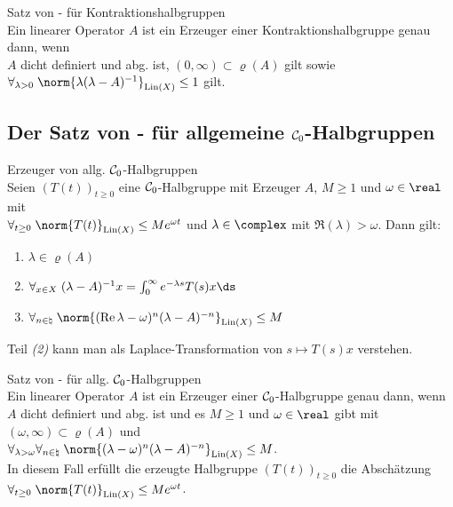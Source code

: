\begin{Satz}{Satz von - für Kontraktionshalbgruppen}\\
    Ein linearer Operator $A$ ist ein Erzeuger einer Kontraktionshalbgruppe genau dann, wenn\\
    $A$ dicht definiert und abg. ist,
    $(0, \infty) \subset \varrho(A)$ gilt sowie
    $\forall_{\lambda > 0}\; \norm{\lambda (\lambda-A)^{-1}}_{\Lin(X)} \le 1$ gilt.
\end{Satz}

\pagebreak

\subsection{%
    Der Satz von - für allgemeine \texorpdfstring{$\mathcal{C}_0$}{C₀}-Halbgruppen%
}

\begin{Satz}{Erzeuger von allg. $\mathcal{C}_0$-Halbgruppen}\\
    Seien $(T(t))_{t \ge 0}$ eine $\mathcal{C}_0$-Halbgruppe mit Erzeuger $A$,
    $M \ge 1$ und $\omega \in \real$ mit\\
    $\forall_{t \ge 0}\; \norm{T(t)}_{\Lin(X)} \le M e^{\omega t}$ und
    $\lambda \in \complex$ mit $\Re(\lambda) > \omega$.
    Dann gilt:
    \begin{enumerate}
        \item
        $\lambda \in \varrho(A)$

        \item
        $\forall_{x \in X}\; (\lambda-A)^{-1} x = \int_0^\infty e^{-\lambda s} T(s) x \ds$

        \item
        $\forall_{n \in \natural}\;
        \norm{(\Re \lambda - \omega)^n (\lambda-A)^{-n}}_{\Lin(X)} \le M$
    \end{enumerate}
\end{Satz}

\begin{Bem}
    Teil \emph{(2)} kann man als Laplace-Transformation von $s \mapsto T(s) x$ verstehen.
\end{Bem}

\linie

\begin{Satz}{Satz von - für allg. $\mathcal{C}_0$-Halbgruppen}\\
    Ein linearer Operator $A$ ist ein Erzeuger einer $\mathcal{C}_0$-Halbgruppe genau dann, wenn\\
    $A$ dicht definiert und abg. ist und
    es $M \ge 1$ und $\omega \in \real$ gibt mit
    $(\omega, \infty) \subset \varrho(A)$ und\\
    $\forall_{\lambda > \omega} \forall_{n \in \natural}\;
    \norm{(\lambda - \omega)^n (\lambda-A)^{-n}}_{\Lin(X)} \le M$.\\
    In diesem Fall erfüllt die erzeugte Halbgruppe $(T(t))_{t \ge 0}$ die Abschätzung\\
    $\forall_{t \ge 0}\; \norm{T(t)}_{\Lin(X)} \le M e^{\omega t}$.
\end{Satz}

